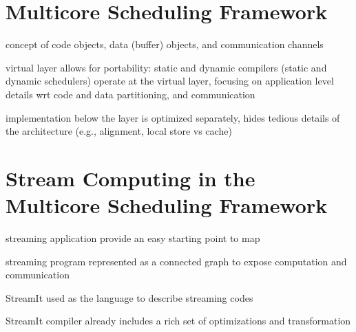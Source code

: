 \section{Multicore Scheduling Framework}

concept of code objects, data (buffer) objects, and communication
channels

virtual layer allows for portability: static and dynamic compilers
(static and dynamic schedulers) operate at the virtual layer, focusing
on application level details wrt code and data partitioning, and
communication

implementation below the layer is optimized separately, hides tedious
details of the architecture (e.g., alignment, local store vs cache)

\section{Stream Computing in the Multicore Scheduling Framework}

streaming application provide an easy starting point to map 

streaming program represented as a connected graph to expose
computation and communication

StreamIt used as the language to describe streaming codes

StreamIt compiler already includes a rich set of optimizations and
transformation

